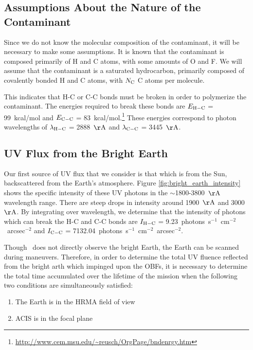 \documentclass[11pt]{article}
\begin{document}
\subsection{Assumptions About the Nature of the Contaminant}

Since we do not know the molecular composition of the contaminant, it will be necessary to make
some assumptions. It is known that the contaminant is composed primarily of H and C atoms,
with some amounts of O and F. We will assume that the contaminant is a saturated hydrocarbon,
primarily composed of covalently bonded H and C atoms, with $N_{\rm C}$ C atoms per molecule.

This indicates that H-C or C-C bonds must be broken in order to polymerize the contaminant. The
energies required to break these bonds are $E_{\rm H-C}$ = 99~kcal/mol and $E_{\rm C-C}$ =
83~kcal/mol.\footnote{\url{http://www.cem.msu.edu/~reusch/OrgPage/bndenrgy.htm}} These energies
correspond to photon wavelengths of $\lambda_{\rm H-C}$ = 2888~${\rm \AA}$ and $\lambda_{\rm C-C}$
= 3445~${\rm \AA}$.

\subsection{UV Flux from the Bright Earth}

Our first source of UV flux that we consider is that which is from the Sun, backscattered
from the Earth's atmosphere. Figure \ref{fig:bright_earth_intensity} shows the specific
intensity of these UV photons in the $\sim$1800-3800~${\rm \AA}$ wavelength range. There
are steep drops in intensity around 1900~${\rm \AA}$ and 3000~${\rm \AA}$. By integrating
over wavelength, we determine that the intensity of photons which can break the H-C and C-C
bonds are $I_{\rm H-C}$ = 9.23~photons~s$^{-1}$~cm$^{-2}$~arcsec$^{-2}$ and $I_{\rm C-C}$ =
7132.04~photons~s$^{-1}$~cm$^{-2}$~arcsec$^{-2}$.

Though \chandra~does not directly observe the bright Earth, the Earth can be scanned during
maneuvers. Therefore, in order to determine the total UV fluence reflected from the bright
arth which impinged upon the OBFs, it is necessary to determine the total time accumulated over
the lifetime of the mission when the following two conditions are simultaneously satisfied:

\begin{enumerate}
\item The Earth is in the HRMA field of view
\item ACIS is in the focal plane
\end{enumerate}
\end{document}
